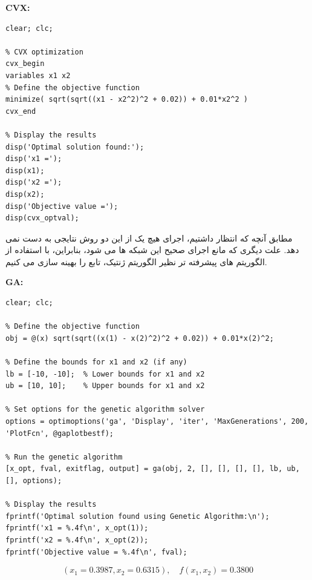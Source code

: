   \textbf{CVX:}
 \begin{latin}
 	\begin{lstlisting}[frame=single,style=Matlab-Pyglike]
% Clear workspace
clear; clc;

% CVX optimization
cvx_begin
variables x1 x2
% Define the objective function
minimize( sqrt(sqrt((x1 - x2^2)^2 + 0.02)) + 0.01*x2^2 )
cvx_end

% Display the results
disp('Optimal solution found:');
disp('x1 =');
disp(x1);
disp('x2 =');
disp(x2);
disp('Objective value =');
disp(cvx_optval);
 	\end{lstlisting}
 \end{latin}
 
 مطابق آنچه که انتظار داشتیم، اجرای هیچ یک از این دو روش نتایجی به دست نمی دهد. علت دیگری که مانع اجرای صحیح این شبکه ها می شود، بنابراین، با استفاده از الگوریتم های پیشرفته تر نظیر الگوریتم ژنتیک، تابع را بهینه سازی می کنیم.
 
   \textbf{GA:}
 \begin{latin}
 	\begin{lstlisting}[frame=single,style=Matlab-Pyglike]
% Clear workspace
clear; clc;

% Define the objective function
obj = @(x) sqrt(sqrt((x(1) - x(2)^2)^2 + 0.02)) + 0.01*x(2)^2;

% Define the bounds for x1 and x2 (if any)
lb = [-10, -10];  % Lower bounds for x1 and x2
ub = [10, 10];    % Upper bounds for x1 and x2

% Set options for the genetic algorithm solver
options = optimoptions('ga', 'Display', 'iter', 'MaxGenerations', 200, 'PlotFcn', @gaplotbestf);

% Run the genetic algorithm
[x_opt, fval, exitflag, output] = ga(obj, 2, [], [], [], [], lb, ub, [], options);

% Display the results
fprintf('Optimal solution found using Genetic Algorithm:\n');
fprintf('x1 = %.4f\n', x_opt(1));
fprintf('x2 = %.4f\n', x_opt(2));
fprintf('Objective value = %.4f\n', fval);
 	\end{lstlisting}
 \end{latin}
 
 \[
 (x_1 = 0.3987, x_2 = 0.6315) , \quad f(x_1, x_2) = 0.3800
 \]
 
 
 
 
 
 
 
 
 
 
 